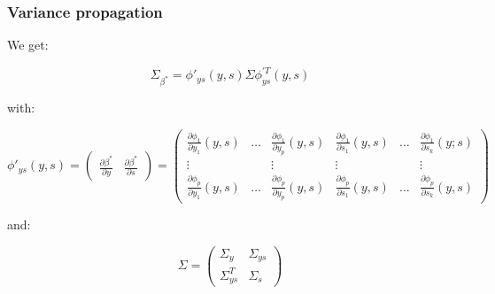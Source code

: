 \documentclass[aspectratio=169]{beamer}
\begin{document}
\begin{frame}
	\frametitle{Variance propagation}
	We get:

	\begin{equation*}
	\Sigma_{\beta^*} =  \phi'_{ys} \left( y , s \right) \Sigma \phi^{'T}_{ys} \left( y , s \right)
	\end{equation*}

	with:

	\begin{equation*}
	\phi'_{ys} \left( y , s \right) = \begin{pmatrix} \frac{\partial \beta^*}{\partial y} & \frac{\partial \beta^*}{\partial s} \end{pmatrix} = \begin{pmatrix} \frac{\partial \phi_1}{\partial y_1} \left( y , s \right) & \hdots & \frac{\partial \phi_1}{\partial y_p} \left( y , s \right) & \frac{\partial \phi_1}{\partial s_1} \left( y , s \right) & \hdots & \frac{\partial \phi_1}{\partial s_k} \left( y ; s \right) \\ \vdots & & \vdots & \vdots & & \vdots \\ \frac{\partial \phi_p}{\partial y_1} \left( y , s \right) & \hdots & \frac{\partial \phi_p}{\partial y_p} \left( y , s \right) & \frac{\partial \phi_p}{\partial s_1} \left( y , s \right) & \hdots & \frac{\partial \phi_p}{\partial s_k} \left( y , s \right) \end{pmatrix}
	\end{equation*}

	and:

	\begin{equation*}
	\Sigma = \begin{pmatrix} \Sigma_y & \Sigma_{ys} \\ \Sigma_{ys}^T & \Sigma_s \end{pmatrix}
	\end{equation*}
\end{frame}
\end{document}

